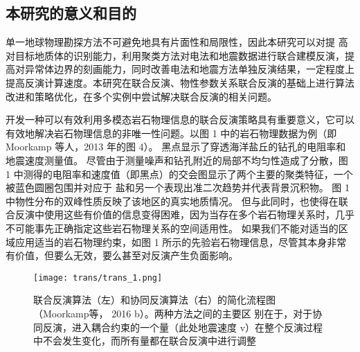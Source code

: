 \subsection{本研究的意义和目的}

单一地球物理勘探方法不可避免地具有片面性和局限性，因此本研究可以对提 高对目标地质体的识别能力，利用聚类方法对电法和地震数据进行联合建模反演，提高对异常体边界的刻画能力，同时改善电法和地震方法单独反演结果，一定程度上提高反演计算速度。本研究在联合反演、物性参数关系联合反演的基础上进行算法改进和策略优化，在多个实例中尝试解决联合反演的相关问题。

开发一种可以有效利用多模态岩石物理信息的联合反演策略具有重要意义，它可以有效地解决岩石物理信息的非唯一性问题。以图 1 中的岩石物理数据为例（即 Moorkamp 等人，2013 年的图 4）。 黑点显示了穿透海洋盐丘的钻孔的电阻率和地震速度测量值。 尽管由于测量噪声和钻孔附近的局部不均匀性造成了分散，图 1 中测得的电阻率和速度值（即黑点）的交会图显示了两个主要的聚类特征，一个被蓝色圆圈包围并对应于 盐和另一个表现出准二次趋势并代表背景沉积物。 图 1 中物性分布的双峰性质反映了该地区的真实地质情况。 但与此同时，也使得在联合反演中使用这些有价值的信息变得困难，因为当存在多个岩石物理关系时，几乎不可能事先正确指定这些岩石物理关系的空间适用性。 如果我们不能对适当的区域应用适当的岩石物理约束，如图 1 所示的先验岩石物理信息，尽管其本身非常有价值，但要么无效，要么甚至对反演产生负面影响。

\begin{figure}
    \centering
    \texttt{[image: trans/trans\_1.png]}
    \caption[]{联合反演算法（左）和协同反演算法（右）的简化流程图（Moorkamp等， 2016 b）。两种方法之间的主要区 别在于，对于协同反演，进入耦合约束的一个量（此处地震速度 v）在整个反演过程中不会发生变化，而所有量都在联合反演中进行调整} \label{ktbg1}
\end{figure}